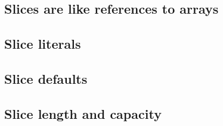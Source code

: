 \subsection{Slices are like references to arrays}




\subsection{Slice literals}




\subsection{Slice defaults}




\subsection{Slice length and capacity}




